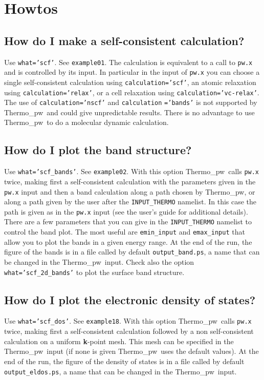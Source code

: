 \documentclass[12pt,a4paper,twoside]{report}
\def\thermo{{\sc Thermo}\_{\sc pw}}
\begin{document}
\newpage
{\color{dark-blue}\chapter{Howtos}}

{\color{coral}\section{How do I make a self-consistent calculation?}}
\color{black}
Use \texttt{what='scf'}. See \texttt{example01}. The calculation is
equivalent to a call to \texttt{pw.x} and is controlled by
its input. In particular in the input of \texttt{pw.x} you can choose
a single self-consistent calculation using \texttt{calculation='scf'}, 
an atomic relaxation using \texttt{calculation='relax'}, or a cell relaxation 
using \texttt{calculation='vc-relax'}.
The use of \texttt{calculation='nscf'} and \texttt{calculation}
\texttt{='bands'} is
not supported by \thermo\ and could give unpredictable results.
There is no advantage to use \thermo\ to do a molecular dynamic
calculation. 

\newpage

{\color{coral}\section{How do I plot the band structure?}}
\color{black}
Use \texttt{what='scf\_bands'}. See \texttt{example02}.
With this option \thermo\ calls 
\texttt{pw.x} twice, making first a self-consistent calculation with 
the parameters
given in the \texttt{pw.x} input and then a band calculation along a 
path chosen by \thermo, or along a path given by the user
after the \texttt{INPUT\_THERMO} namelist. In this case the path is given as
in the \texttt{pw.x} input (see the user's guide for additional details).
There are a few parameters that you can give in the \texttt{INPUT\_THERMO} namelist to control the band plot. The most useful are 
\texttt{emin\_input} and \texttt{emax\_input} that allow you to plot the 
bands in a given energy range. At the end of the run, the figure of 
the bands is in a file called by default \texttt{output\_band.ps}, a name
that can be changed in the \thermo\ input.
Check also the option \texttt{what='scf\_2d\_bands'} 
to plot the surface band structure.

\newpage

{\color{coral}\section{How do I plot the electronic density of states?}}
\color{black}
Use \texttt{what='scf\_dos'}. See \texttt{example18}. With this option
\thermo\ calls \texttt{pw.x} twice, making first a self-consistent calculation
followed by a non self-consistent calculation on a uniform {\bf k}-point mesh.
This mesh can be specified in the \thermo\ input (if none is given \thermo\ 
uses the default values). At the end of the run, the figure of the density of
states is in a file called by default \texttt{output\_eldos.ps}, a name
that can be changed in the \thermo\ input.
\newpage
\end{document}
